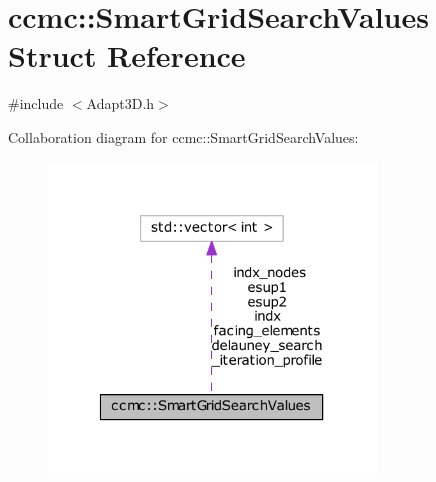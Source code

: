 \hypertarget{structccmc_1_1_smart_grid_search_values}{\section{ccmc\-:\-:Smart\-Grid\-Search\-Values Struct Reference}
\label{structccmc_1_1_smart_grid_search_values}
}


{\ttfamily \#include $<$Adapt3\-D.\-h$>$}



Collaboration diagram for ccmc\-:\-:Smart\-Grid\-Search\-Values\-:
\nopagebreak
\begin{figure}[H]
\begin{center}
\leavevmode
\includegraphics[width=247pt]{structccmc_1_1_smart_grid_search_values__coll__graph}
\end{center}
\end{figure}
